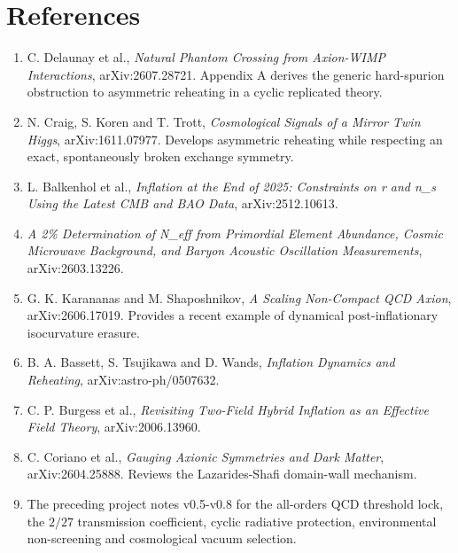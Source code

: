 \documentclass[
  10pt,
]{article}
\providecommand{\tightlist}{%
  \setlength{\itemsep}{0pt}\setlength{\parskip}{0pt}}
\begin{document}
\section{References}\label{references}

\begin{enumerate}
\def\labelenumi{\arabic{enumi}.}
\tightlist
\item
  C. Delaunay et al., \emph{Natural Phantom Crossing from Axion-WIMP
  Interactions}, arXiv:2607.28721. Appendix A derives the generic
  hard-spurion obstruction to asymmetric reheating in a cyclic
  replicated theory.
\item
  N. Craig, S. Koren and T. Trott, \emph{Cosmological Signals of a
  Mirror Twin Higgs}, arXiv:1611.07977. Develops asymmetric reheating
  while respecting an exact, spontaneously broken exchange symmetry.
\item
  L. Balkenhol et al., \emph{Inflation at the End of 2025: Constraints
  on r and n\_s Using the Latest CMB and BAO Data}, arXiv:2512.10613.
\item
  \emph{A 2\% Determination of N\_eff from Primordial Element Abundance,
  Cosmic Microwave Background, and Baryon Acoustic Oscillation
  Measurements}, arXiv:2603.13226.
\item
  G. K. Karananas and M. Shaposhnikov, \emph{A Scaling Non-Compact QCD
  Axion}, arXiv:2606.17019. Provides a recent example of dynamical
  post-inflationary isocurvature erasure.
\item
  B. A. Bassett, S. Tsujikawa and D. Wands, \emph{Inflation Dynamics and
  Reheating}, arXiv:astro-ph/0507632.
\item
  C. P. Burgess et al., \emph{Revisiting Two-Field Hybrid Inflation as
  an Effective Field Theory}, arXiv:2006.13960.
\item
  C. Coriano et al., \emph{Gauging Axionic Symmetries and Dark Matter},
  arXiv:2604.25888. Reviews the Lazarides-Shafi domain-wall mechanism.
\item
  The preceding project notes v0.5-v0.8 for the all-orders QCD threshold
  lock, the \(2/27\) transmission coefficient, cyclic radiative
  protection, environmental non-screening and cosmological vacuum
  selection.
\end{enumerate}
\end{document}
